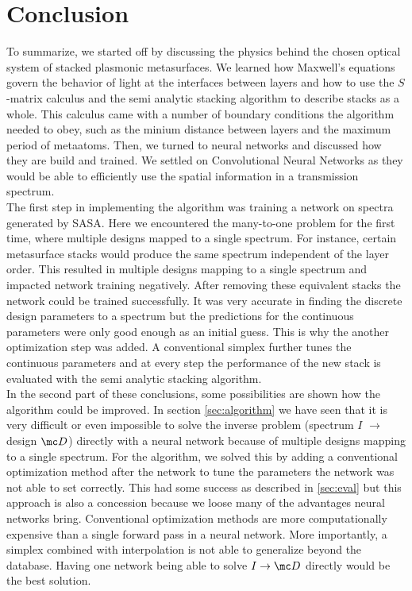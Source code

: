 \section{Conclusion} \label{sec:conclusion}
To summarize, we started off by discussing the physics behind the chosen optical system of stacked plasmonic metasurfaces. 
We learned how Maxwell's equations govern the behavior of light at the interfaces between layers and how to use the $S$-matrix calculus and the semi analytic stacking algorithm to describe stacks as a whole. This calculus came with a number of boundary conditions the algorithm needed to obey, such as the minium distance between layers and the maximum period of metaatoms. Then, we turned to neural networks and discussed how they are build and trained. We settled on Convolutional Neural Networks as they would be able to efficiently use the spatial information in a transmission spectrum.
\\

\indent
The first step in implementing the algorithm was training a network on spectra generated by SASA. Here we encountered the many-to-one problem for the first time, where multiple designs mapped to a single spectrum. For instance, certain metasurface stacks would produce the same spectrum independent of the layer order. This resulted in multiple designs mapping to a single spectrum and impacted network training negatively. After removing these equivalent stacks the network could be trained successfully. It was very accurate in finding the discrete design parameters to a spectrum but the predictions for the continuous parameters were only good enough as an initial guess.
This is why the another optimization step was added. A conventional simplex further tunes the continuous parameters and at every step the performance of the new stack is evaluated with the semi analytic stacking algorithm. 
\\

\indent
In the second part of these conclusions, some possibilities are shown how the algorithm could be improved.
In section \ref{sec:algorithm} we have seen that it is very difficult or even impossible to solve the inverse problem (spectrum $I$ $\rightarrow$ design $\mc D$) directly with a neural network because of multiple designs mapping to a single spectrum.
For the algorithm, we solved this by adding a conventional optimization method after the network to tune the parameters the network was not able to set correctly.
This had some success as described in \ref{sec:eval}  but this approach is also a concession because we loose many of the advantages neural networks bring. Conventional optimization methods are more computationally expensive than a single forward pass in a neural network.
More importantly, a simplex combined with interpolation is not able to generalize beyond the database.
Having one network being able to solve $I \rightarrow \mc D$ directly would be the best solution.
\\

